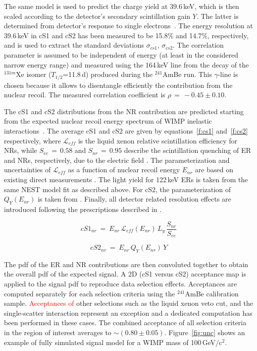 The same model is used to predict the charge yield at 39.6\,keV, which is then scaled according to the detector's secondary scintillation gain $Y$. 
 The latter is determined from detector's response to single electrons~\cite{SingleE}.
The energy resolution at 39.6\,keV in cS1 and cS2 has been measured to be 15.8\% and 14.7\%, respectively, and is used to extract the standard 
deviations $\sigma_{cs1}$, $\sigma_{cs2}$.  The correlation parameter is assumed to be independent of energy (at least in the considered narrow energy range) and measured
using the 164\,keV line from the decay of the $^{131m}$Xe isomer ($T_{1/2}$=11.8\,d) produced during the  $^{241}$AmBe run. This $\gamma$-line is chosen because it allows to disentangle efficiently the contribution from the nuclear recoil. The measured correlation coefficient is $\rho \, = \, -0.45 \pm 0.10$. 


The cS1 and cS2 distributions from the NR contribution are predicted starting from the expected nuclear recoil energy spectrum
of WIMP inelastic interactions~\cite{Baudis:2013bba}. The average cS1 and cS2 are given by equations~\ref{f:cs1} and~\ref{f:cs2} respectively,
where $\mathcal{L}_{eff}$ is the liquid xenon relative scintillation efficiency for NRs, while $S_{ee} \, = \, 0.58$  and $S_{nr} \, = \, 0.95$ describe the scintillation 
quenching  of ER and NRs, respectively, due to the electric field \cite{ScintQuenching}. The parameterization and uncertainties of $\mathcal{L}_{eff}$ as a function of nuclear recoil energy $E_{nr}$ are based on existing 
direct measurements \cite{run8Result}. The light yield for 122\,keV ERs is taken from the same NEST model fit as described above. For cS2, the parameterization 
of $Q_{Y}(E_{nr})$ is taken from \cite{QY}. Finally, all detector related resolution effects are introduced following the prescriptions described in \cite{Aprile:2012vw}.

\begin{equation}
cS1_{nr} ~=~ E_{nr} \, \mathcal{L}_{eff}(E_{nr}) \, L_{y} \, \frac{S_{nr}}{S_{ee}}
\label{f:cs1}
\end{equation}

\begin{equation}
cS2_{nr}  ~ = ~ E_{nr} \, Q_{Y}(E_{nr}) \, Y
\label{f:cs2}
\end{equation}

The pdf of the ER and NR contributions are then convoluted together to obtain the overall pdf of the expected signal.
A 2D (cS1 versus cS2) acceptance map is applied to the signal pdf to reproduce data selection effects. Acceptances are computed separately for each selection 
criteria using the $^{241}$AmBe calibration sample. \textcolor{red}{Acceptances of} other selections such as the liquid xenon veto cut, and the single-scatter interaction represent an exception  and 
a dedicated computation has been performed in these cases. The combined acceptance  of all selection criteria in the region of interest averages to $\sim$$(0.80\pm0.05)$. 
Figure~\ref{fig:unc} shows an example of fully simulated signal model for a WIMP mass of 100\,GeV/c$^2$. 

